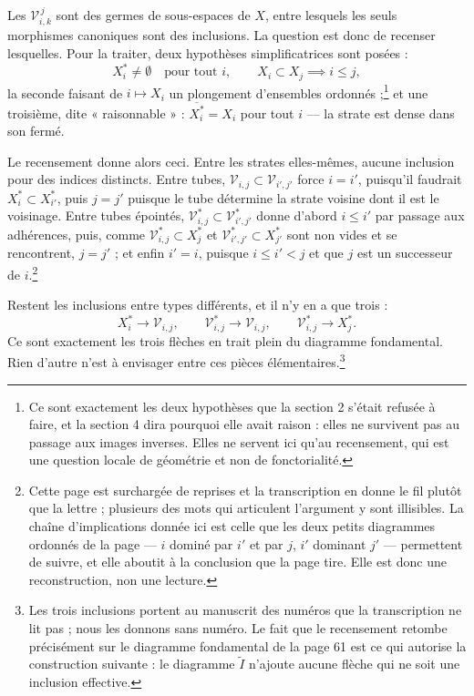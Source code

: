 \documentclass[11pt,a4paper]{article}
\begin{document}
Les $\mathcal{V}^{\,j}_{i,k}$ sont des germes de sous-espaces de $X$, entre
lesquels les seuls morphismes canoniques sont des inclusions. La question est
donc de recenser lesquelles. Pour la traiter, deux hypothèses simplificatrices
sont posées :
\[
  X_{i}^{*} \neq \emptyset \quad \text{pour tout } i,
  \qquad X_{i} \subset X_{j} \implies i \leq j,
\]
la seconde faisant de $i \mapsto X_{i}$ un plongement d'ensembles
ordonnés ;\footnote{Ce sont exactement les deux hypothèses que la section 2
s'était refusée à faire, et la section 4 dira pourquoi elle avait raison : elles
ne survivent pas au passage aux images inverses. Elles ne servent ici qu'au
recensement, qui est une question locale de géométrie et non de fonctorialité.}
et une troisième, dite « raisonnable » :
$\overline{X_{i}^{*}} = X_{i}$ pour tout $i$ — la strate est dense dans son
fermé.

Le recensement donne alors ceci. Entre les strates elles-mêmes, aucune inclusion
pour des indices distincts. Entre tubes, $\mathcal{V}_{i,j} \subset
\mathcal{V}_{i',j'}$ force $i = i'$, puisqu'il faudrait $X_{i}^{*} \subset
X_{i'}^{*}$, puis $j = j'$ puisque le tube détermine la strate voisine dont il
est le voisinage. Entre tubes épointés, $\mathcal{V}^{*}_{i,j} \subset
\mathcal{V}^{*}_{i',j'}$ donne d'abord $i \leq i'$ par passage aux adhérences,
puis, comme $\mathcal{V}^{*}_{i,j} \subset X_{j}^{*}$ et
$\mathcal{V}^{*}_{i',j'} \subset X_{j'}^{*}$ sont non vides et se rencontrent,
$j = j'$ ; et enfin $i' = i$, puisque $i \leq i' < j$ et que $j$ est un
successeur de $i$.\footnote{Cette page est surchargée de reprises et la
transcription en donne le fil plutôt que la lettre ; plusieurs des mots qui
articulent l'argument y sont illisibles. La chaîne d'implications donnée ici est
celle que les deux petits diagrammes ordonnés de la page — $i$ dominé par $i'$ et
par $j$, $i'$ dominant $j'$ — permettent de suivre, et elle aboutit à la
conclusion que la page tire. Elle est donc une reconstruction, non une lecture.}

Restent les inclusions entre types différents, et il n'y en a que trois :
\[
  X_{i}^{*} \longrightarrow \mathcal{V}_{i,j}, \qquad
  \mathcal{V}^{*}_{i,j} \longrightarrow \mathcal{V}_{i,j}, \qquad
  \mathcal{V}^{*}_{i,j} \longrightarrow X_{j}^{*}.
\]
Ce sont exactement les trois flèches en trait plein du diagramme fondamental.
Rien d'autre n'est à envisager entre ces pièces élémentaires.\footnote{Les trois
inclusions portent au manuscrit des numéros que la transcription ne lit pas ;
nous les donnons sans numéro. Le fait que le recensement retombe précisément sur
le diagramme fondamental de la page 61 est ce qui autorise la construction
suivante : le diagramme $\widetilde{I}$ n'ajoute aucune flèche qui ne soit une
inclusion effective.}
\end{document}
